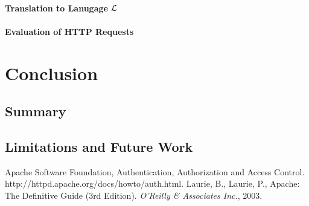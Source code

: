 \documentclass{llncs}
\begin{document}
      \paragraph{\bf Translation to Lanugage ${\cal L}$}

      \paragraph{\bf Evaluation of HTTP Requests}

  \section{Conclusion}

    \subsection{Summary}

    \subsection{Limitations and Future Work}

  \begin{thebibliography}{3}
      Apache Software Foundation,
      Authentication, Authorization and Access Control.
      http://httpd.apache.org/docs/howto/auth.html.
      Laurie, B., Laurie, P.,
      Apache: The Definitive Guide (3rd Edition).
      {\em O'Reilly \& Associates Inc.}, 2003.
  \end{thebibliography}
\end{document}
